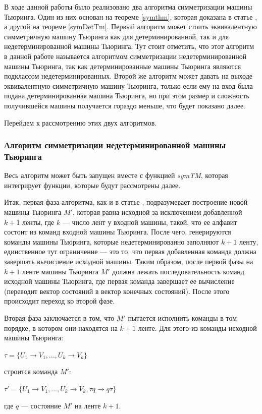 \documentclass[14pt]{matmex-diploma-custom}
\begin{document}
В ходе данной работы было реализовано два алгоритма симметризации машины Тьюринга. Один из них основан на теореме \ref{symthm}, которая доказана в статье \cite{Sapir}, а другой на теореме \ref{symDetTm}. Первый алгоритм может стоить эквивалентную симметричную машину Тьюринга как для детерминированной, так и для недетерминированной машины Тьюринга. Тут стоит отметить, что этот алгоритм в данной работе называется алгоритмом симметризации недетерминированной машины Тьюринга, так как детерминированные машины Тьюринга являются подклассом недетерминированных. Второй же алгоритм может давать на выходе эквивалентную симметричную машину Тьюринга, только если ему на вход была подана детерминированная машина Тьюринга, но при этом размер и сложность получившейся машины получается гораздо меньше, что будет показано далее.

Перейдем к рассмотрению этих двух алгоритмов.

\subsubsection{Алгоритм симметризации недетерминированной машины Тьюринга}
Весь алгоритм может быть запущен вместе с функцией \textit{symTM}, которая интегрирует функции, которые будут рассмотрены далее.

Итак, первая фаза алгоритма, как и в статье \cite{Sapir}, подразумевает построение новой машины Тьюринга $M'$, которая равна исходной за исключением добавленной $k+1$ ленты, где $k$ --- число лент у входной машины, такой, что ее алфавит состоит из команд входной машины Тьюринга. После чего, генерируются команды машины Тьюринга, которые недетерминированно заполняют $k+1$ ленту, единственное тут ограничение --- это то, что первая добавленная команда должна завершать вычисление исходной машины. Таким образом, после первой фазы на $k+1$ ленте машины Тьюринга $M'$ должна лежать последовательность команд исходной машины Тьюринга, где первая команда завершает ее вычисление (переводит вектор состояний в вектор конечных состояний). После этого происходит переход ко второй фазе. 

Вторая фаза заключается в том, что $M'$ пытается исполнить команды в том порядке, в котором они находятся на $k+1$ ленте. Для этого из команды исходной машины Тьюринга:
\begin{center}
    $\tau = \{ U_1 \to V_1, ... , U_k \to V_k \}$
\end{center}
строится команда $M'$:
\begin{center}
    $\tau' = \{ U_1 \to V_1, ... , U_k \to V_k, \tau q \to q \tau \}$
\end{center}
где $q$ --- состояние $M'$ на ленте $k+1$. 
\end{document}

